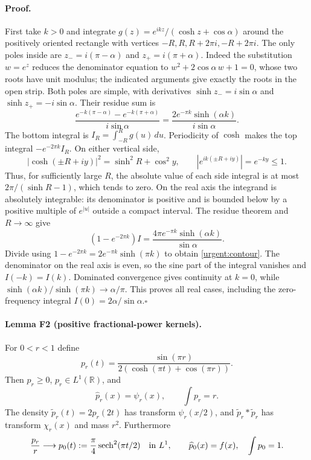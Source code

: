 \paragraph{Proof.}
First take $k>0$ and integrate
$g(z)=e^{ikz}/(\cosh z+\cos\alpha)$ around the positively oriented
rectangle with vertices $-R,R,R+2\pi i,-R+2\pi i$.
The only poles inside are
$z_-=i(\pi-\alpha)$ and $z_+=i(\pi+\alpha)$.
Indeed the substitution $w=e^z$ reduces the denominator equation to
$w^2+2\cos\alpha\,w+1=0$, whose two roots have unit modulus;
the indicated arguments give exactly the roots in the open strip.
Both poles are simple, with derivatives
$\sinh z_-=i\sin\alpha$ and $\sinh z_+=-i\sin\alpha$.
Their residue sum is
\[
 \frac{e^{-k(\pi-\alpha)}-e^{-k(\pi+\alpha)}}{i\sin\alpha}
 =\frac{2e^{-\pi k}\sinh(\alpha k)}{i\sin\alpha}.
\]
The bottom integral is $I_R=\int_{-R}^R g(u)\,du$.
Periodicity of $\cosh$ makes the top integral
$-e^{-2\pi k}I_R$. On either vertical side,
\[
 |\cosh(\pm R+iy)|^2=\sinh^2R+\cos^2y,
 \qquad |e^{ik(\pm R+iy)}|=e^{-ky}\leq1.
\]
Thus, for sufficiently large $R$, the absolute value of each side
integral is at most $2\pi/(\sinh R-1)$, which tends to zero.
On the real axis the integrand is absolutely integrable: its denominator
is positive and is bounded below by a positive multiple of $e^{|u|}$
outside a compact interval. The residue theorem and $R\to\infty$ give
\[
 (1-e^{-2\pi k})I
 =\frac{4\pi e^{-\pi k}\sinh(\alpha k)}{\sin\alpha}.
\]
Divide using $1-e^{-2\pi k}=2e^{-\pi k}\sinh(\pi k)$ to obtain
\eqref{urgent:contour}. The denominator on the real axis is even, so the
sine part of the integral vanishes and $I(-k)=I(k)$.
Dominated convergence gives continuity at $k=0$, while
$\sinh(\alpha k)/\sinh(\pi k)\to\alpha/\pi$.
This proves all real cases, including the zero-frequency integral
$I(0)=2\alpha/\sin\alpha$.\hfill$\square$

\paragraph{Lemma F2 (positive fractional-power kernels).}
For $0<r<1$ define
\[
 p_r(t)=\frac{\sin(\pi r)}{2(\cosh(\pi t)+\cos(\pi r))}.
\]
Then $p_r\geq0$, $p_r\in L^1(\mathbb R)$, and
\[
 \widehat p_r(x)=\psi_r(x),\qquad \int p_r=r.
\]
The density $\widetilde p_r(t)=2p_r(2t)$ has transform
$\psi_r(x/2)$, and $\widetilde p_r*\widetilde p_r$ has transform
$\chi_r(x)$ and mass $r^2$.
Furthermore
\[
 \frac{p_r}{r}\longrightarrow
 p_0(t):=\frac\pi4\operatorname{sech}^2(\pi t/2)
 \quad\hbox{in }L^1,\qquad
 \widehat p_0(x)=f(x),\quad\int p_0=1.
\]

